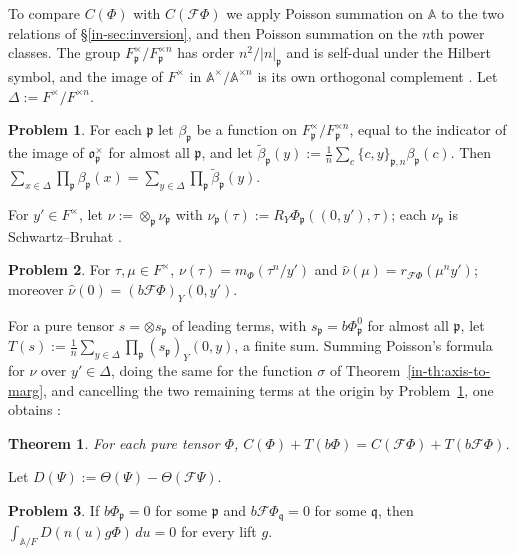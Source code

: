 \documentclass[reqno]{amsart}
\newcommand{\Fc}{\mathcal{F}}
\newcommand{\Ab}{\mathbb{A}}
\newcommand{\oo}{\mathfrak{o}}
\newcommand{\pp}{\mathfrak{p}}
\numberwithin{equation}{section}
\theoremstyle{definition}
\newtheorem{problem}{Problem}[section]
\theoremstyle{plain}
\newtheorem{theorem}{Theorem}[section]
\begin{document}
To compare $C(\Phi)$ with $C(\Fc \Phi)$ we apply Poisson summation on $\Ab$ \cite[\S4.2]{Tate} to the two relations of \S\ref{in-sec:inversion}, and then Poisson summation on the $n$th power classes.  The group $F_\pp^\times / F_\pp^{\times n}$ has order $n^2 / \lvert n \rvert_\pp$ \cite[Ch.~II, Corollary~5.8]{Neu} and is self-dual under the Hilbert symbol, and the image of $F^\times$ in $\Ab^\times / \Ab^{\times n}$ is its own orthogonal complement \cite[Ch.~XIII, \S5, Proposition~8]{Weil}.  Let $\Delta := F^\times / F^{\times n}$.

\begin{problem}\label{pr:isotropy}
  For each $\pp$ let $\beta_\pp$ be a function on $F_\pp^\times / F_\pp^{\times n}$, equal to the indicator of the image of $\oo_\pp^\times$ for almost all $\pp$, and let $\tilde{\beta}_\pp(y) := \frac{1}{n} \sum_c \{c, y\}_{\pp, n} \beta_\pp(c)$.  Then $\sum_{x \in \Delta} \prod_\pp \beta_\pp(x) = \sum_{y \in \Delta} \prod_\pp \tilde{\beta}_\pp(y)$.
\end{problem}

For $y' \in F^\times$, let $\nu := \otimes_\pp \nu_\pp$ with $\nu_\pp(\tau) := R_Y \Phi_\pp((0, y'), \tau)$; each $\nu_\pp$ is Schwartz--Bruhat \cite[Lemma~A.4]{N}.

\begin{problem}\label{pr:nu-values}
  For $\tau, \mu \in F^\times$, $\nu(\tau) = m_\Phi(\tau^n / y')$ and $\hat{\nu}(\mu) = r_{\Fc \Phi}(\mu^n y')$; moreover $\hat{\nu}(0) = (b \Fc \Phi)_Y(0, y')$.
\end{problem}

For a pure tensor $s = \otimes s_\pp$ of leading terms, with $s_\pp = b \Phi_\pp^0$ for almost all $\pp$, let $T(s) := \frac{1}{n} \sum_{y \in \Delta} \prod_\pp (s_\pp)_Y(0, y)$, a finite sum.  Summing Poisson's formula for $\nu$ over $y' \in \Delta$, doing the same for the function $\sigma$ of Theorem~\ref{in-th:axis-to-marg}, and cancelling the two remaining terms at the origin by Problem~\ref{pr:isotropy}, one obtains \cite[Proposition~B.4]{N}:

\begin{theorem}\label{th:constant-terms}
  For each pure tensor $\Phi$, $C(\Phi) + T(b \Phi) = C(\Fc \Phi) + T(b \Fc \Phi)$.
\end{theorem}

Let $D(\Psi) := \Theta(\Psi) - \Theta(\Fc \Psi)$.

\begin{problem}\label{pr:translated-ct}
  If $b \Phi_\pp = 0$ for some $\pp$ and $b \Fc \Phi_{\mathfrak{q}} = 0$ for some $\mathfrak{q}$, then $\int_{\Ab / F} D(n(u) g \Phi) \, d u = 0$ for every lift $g$.
\end{problem}
\end{document}

